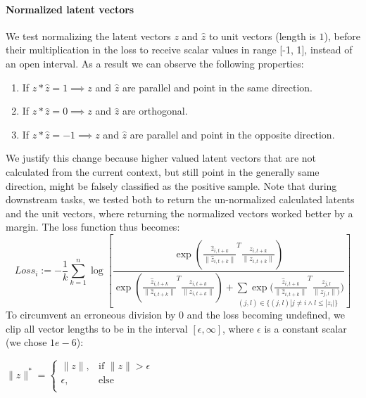 \paragraph{Normalized latent vectors}\label{sec:normalizedlatents}
We test normalizing the latent vectors $z$ and $\hat{z}$ to unit vectors (length is $1$), before their multiplication in the loss to receive scalar values in range [-1, 1], instead of an open interval. As a result we can observe the following properties:
\begin{enumerate}
	\item If $z*\hat{z} = 1 \implies z$ and $\hat{z}$ are parallel and point in the same direction.
	\item If $z*\hat{z} = 0 \implies z$ and $\hat{z}$ are orthogonal.
	\item If $z*\hat{z} = -1 \implies z$ and $\hat{z}$ are parallel and point in the opposite direction.
\end{enumerate}
We justify this change because higher valued latent vectors that are not calculated from the current context, but still point in the generally same direction, might be falsely classified as the positive sample. Note that during downstream tasks, we tested both to return the un-normalized calculated latents and the unit vectors, where returning the normalized vectors worked better by a margin. The loss function thus becomes:
\begin{equation}
	\mathit{Loss}_i := -\frac{1}{k}\sum_{k=1}^{n}\log\left[\frac{\exp(\frac{\hat{z}_{i, t+k}}{\|\hat{z}_{i, t+k}\|}^T\frac{z_{i, t+k}}{\|z_{i, t+k}\|})}{\exp(\frac{\hat{z}_{i, t+k}}{\|\hat{z}_{i, t+k}\|}^T\frac{z_{i, t+k}}{\|z_{i, t+k}\|})+\underset{{(j,l)\in \{(j,l)|j\neq i \land l \leq |z_i|\}}}{\sum \exp(\frac{\hat{z}_{i, t+k}}{\|\hat{z}_{i, t+k}\|}^T\frac{z_{j, l}}{\|z_{j, l}\|)}})}\right]
\end{equation}
To circumvent an erroneous division by $0$ and the loss becoming undefined, we clip all vector lengths to be in the interval $[\epsilon, \infty]$, where $\epsilon$ is a constant scalar (we chose $1e-6$):

$\|z\|^*=
\begin{cases}
	\|z\|,& \text{if } \|z\| > \epsilon\\
	\epsilon,& \text{else}\\
\end{cases}$


